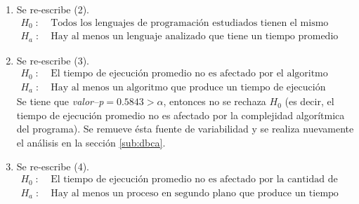 \documentclass[11pt,a4paper]{article}
\begin{document}
\begin{enumerate}
	\item[\fbox{Hip. Principal}] Se re-escribe (2).
		\[
			\begin{array}{rl}
				H_0 \;:\; & \mbox{Todos los lenguajes de programación estudiados tienen el mismo tiempo de ejecución promedio.} \\
				H_a \;:\; & \mbox{Hay al menos un lenguaje analizado que tiene un tiempo promedio de ejecución diferente.}
			\end{array}
		\]
	\item[\fbox{Hip. Secundaria 1}] Se re-escribe (3).
		\[
			\begin{array}{rl}
				H_0 \;:\; & \mbox{El tiempo de ejecución promedio no es afectado por el algoritmo programado.} \\
				H_a \;:\; & \mbox{Hay al menos un algoritmo que produce un tiempo de ejecución promedio diferente.}
			\end{array}
		\]
		Se tiene que \textit{valor--p\(= 0.5843 > \alpha\)}, entonces no se rechaza \(H_0\) (es decir, el tiempo de ejecución promedio no es afectado por la complejidad algorítmica del programa).
		Se remueve ésta fuente de variabilidad y se realiza nuevamente el análisis en la sección \ref{sub:dbca}.
	\item[\fbox{Hip. Secundaria 2}] Se re-escribe (4).
		\[
			\begin{array}{rl}
				H_0 \;:\; & \mbox{El tiempo de ejecución promedio no es afectado por la cantidad de procesos en segundo plano.} \\
				H_a \;:\; & \mbox{Hay al menos un proceso en segundo plano que produce un tiempo de ejecución promedio diferente.}
			\end{array}
		\]
\end{enumerate}
\end{document}
